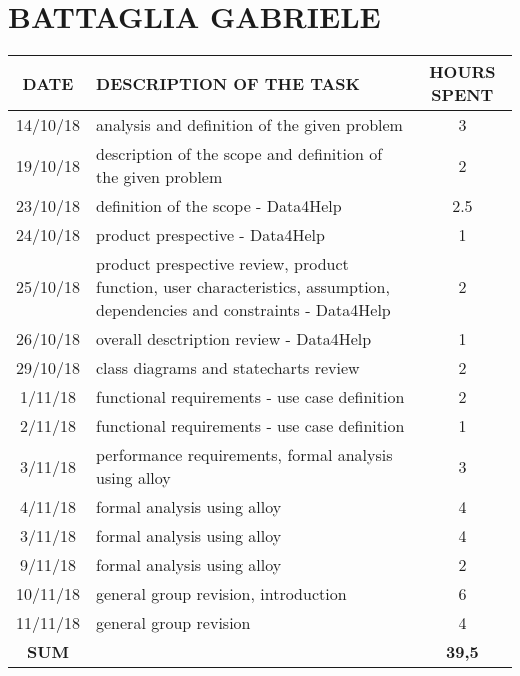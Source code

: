 \section{BATTAGLIA GABRIELE}
\begin{table}[h!]
	\begin{tabular}{|c|p{3in}|c|}
		\hline
		\textbf{DATE} &\textbf{DESCRIPTION OF THE TASK} & \textbf{HOURS SPENT}\\
		\hline
		14/10/18 & analysis and definition of the given problem & 3\\
		\hline
		19/10/18 & description of the scope and definition of the given problem & 2\\
		\hline
		23/10/18 & definition of the scope - Data4Help & 2.5\\
		\hline
		24/10/18 & product prespective - Data4Help & 1\\
		\hline
		25/10/18 & product prespective review, product function, user characteristics, assumption, dependencies and constraints - Data4Help & 2\\
		\hline
		26/10/18 & overall desctription review - Data4Help & 1\\
		\hline
		29/10/18 & class diagrams and statecharts review & 2\\
		\hline
		1/11/18 & functional requirements - use case definition & 2\\
		\hline
		2/11/18 & functional requirements - use case definition & 1\\
		\hline
		3/11/18 & performance requirements, formal analysis using alloy & 3\\
		\hline
		4/11/18 & formal analysis using alloy & 4\\
		\hline
		3/11/18 & formal analysis using alloy & 4\\
		\hline
		9/11/18 & formal analysis using alloy & 2\\
		\hline
		10/11/18 & general group revision, introduction & 6\\
		\hline
		11/11/18 & general group revision & 4\\
		\hline
		\textbf{SUM} &  & 	\textbf{39,5}\\
		\hline
	\end{tabular}
\end{table}

\clearpage

